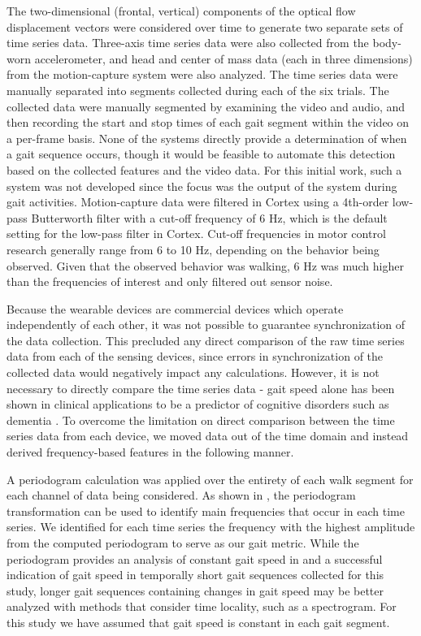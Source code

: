 \documentclass[12pt]{report}
\begin{document}
The two-dimensional (frontal, vertical) components of the optical flow displacement vectors were considered over time to generate two separate sets of time series data. Three-axis time series data were also collected from the body-worn accelerometer, and head and center of mass data (each in three dimensions) from the motion-capture system were also analyzed. The time series data were manually separated into segments collected during each of the six trials. The collected data were manually segmented by examining the video and audio, and then recording the start and stop times of each gait segment within the video on a per-frame basis. None of the systems directly provide a determination of when a gait sequence occurs, though it would be feasible to automate this detection based on the collected features and the video data. For this initial work, such a system was not developed since the focus was the output of the system during gait activities. Motion-capture data were filtered in Cortex using a 4th-order low-pass Butterworth filter with a cut-off frequency of 6 Hz, which is the default setting for the low-pass filter in Cortex. Cut-off frequencies in motor control research generally range from 6 to 10 Hz, depending on the behavior being observed. Given that the observed behavior was walking, 6 Hz was much higher than the frequencies of interest and only filtered out sensor noise.

Because the wearable devices are commercial devices which operate independently of each other, it was not possible to guarantee synchronization of the data collection. This precluded any direct comparison of the raw time series data from each of the sensing devices, since errors in synchronization of the collected data would negatively impact any calculations. However, it is not necessary to directly compare the time series data - gait speed alone has been shown in clinical applications to be a predictor of cognitive disorders such as dementia \cite{Bramell-Risberg2005LowerControls}. To overcome the limitation on direct comparison between the time series data from each device, we moved data out of the time domain and instead derived frequency-based features in the following manner. 

A periodogram calculation was applied over the entirety of each walk segment for each channel of data being considered. As shown in \cite{Schneider2017PreliminaryProcessing}, the periodogram transformation can be used to identify main frequencies that occur in each time series. We identified for each time series the frequency with the highest amplitude from the computed periodogram to serve as our gait metric. While the periodogram provides an analysis of constant gait speed in \cite{Schneider2017PreliminaryProcessing} and a successful indication of gait speed in temporally short gait sequences collected for this study, longer gait sequences containing changes in gait speed may be better analyzed with methods that consider time locality, such as a spectrogram. For this study we have assumed that gait speed is constant in each gait segment.
\end{document}
